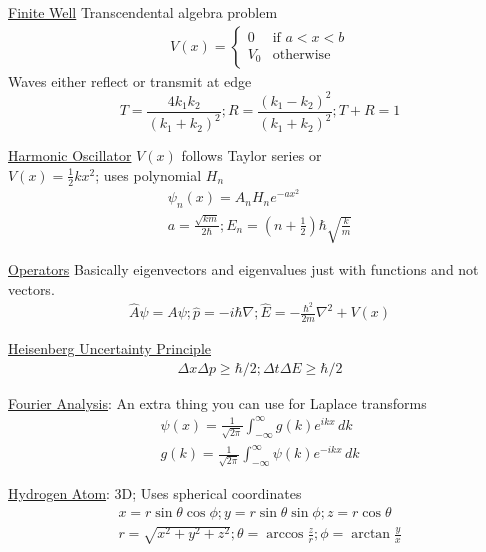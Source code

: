 \documentclass[8pt]{minimal}
\newcommand{\e}[1]{e^{#1}}
\begin{document}
    \underline{Finite Well} Transcendental algebra problem
    \begin{gather*}
        V(x) = \begin{cases}
            0 & \text{if } a < x < b \\
            V_0 & \text{otherwise}
        \end{cases}
    \end{gather*}
    Waves either reflect or transmit at edge
    \begin{equation*}
        T = \frac{4k_1k_2}{(k_1 + k_2)^2}; 
        R = \frac{(k_1 - k_2)^2}{(k_1 + k_2)^2}; 
        T + R = 1
    \end{equation*}

    \underline{Harmonic Oscillator}
    $V(x)$ follows Taylor series or \\$V(x) = \frac{1}{2}kx^2$; uses polynomial $H_n$
    \begin{gather*}
        \psi_n(x) = A_n H_n \e{-ax^2}\\ a = \frac{\sqrt{km}}{2\hbar}; E_n = \left( n + \frac{1}{2} \right) \hbar \sqrt{\frac{k}{m}}
    \end{gather*}

    \underline{Operators} Basically eigenvectors and eigenvalues just with functions and not vectors.
    \begin{gather*}
        \hat{A}\psi = A\psi; \hat{p} = -i\hbar\nabla;
        \hat{E} = -\frac{\hbar^2}{2m}\nabla^2 + V(x)
    \end{gather*}

    \underline{Heisenberg Uncertainty Principle}
        \begin{gather*}
            \Delta x \Delta p \geq \hbar / 2;
            \Delta t \Delta E \geq \hbar / 2
        \end{gather*}
    
    \underline{Fourier Analysis}: An extra thing you can use for Laplace transforms
        \begin{gather*}
            \psi(x) = \frac{1}{\sqrt{2\pi}}\int_{-\infty}^{\infty} g(k) \e{ikx}\,dk\\
            g(k) = \frac{1}{\sqrt{2\pi}}\int_{-\infty}^{\infty} \psi(k) \e{-ikx}\,dk
        \end{gather*}

    \underline{Hydrogen Atom}:
        3D; Uses spherical coordinates
        \begin{gather*}
            x = r \sin\theta \cos\phi; y = r \sin\theta \sin\phi; z = r \cos\theta\\
            r = \sqrt{x^2 + y^2 + z^2}; \theta = \arccos\frac{z}{r}; \phi = \arctan\frac{y}{x}
        \end{gather*}
\end{document}
